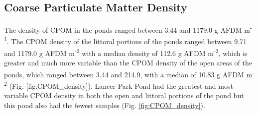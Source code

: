 \subsection{Coarse Particulate Matter Density}

The density of CPOM in the ponds ranged between 3.44 and 1179.0 g AFDM m\textsuperscript{-1}. The CPOM density of the littoral portions of the ponds ranged between 9.71 and 1179.0 g AFDM m\textsuperscript{-2} with a median density of 112.6 g AFDM m\textsuperscript{-2}, which is greater and much more variable than the CPOM density of the open areas of the ponds, which ranged between 3.44 and 214.9, with a median of 10.83 g AFDM m\textsuperscript{-2} (Fig. \ref{fig:CPOM_density}). Lancer Park Pond had the greatest and most variable CPOM density in both the open and littoral portions of the pond but this pond also had the fewest samples (Fig. \ref{fig:CPOM_density}). 
  

  